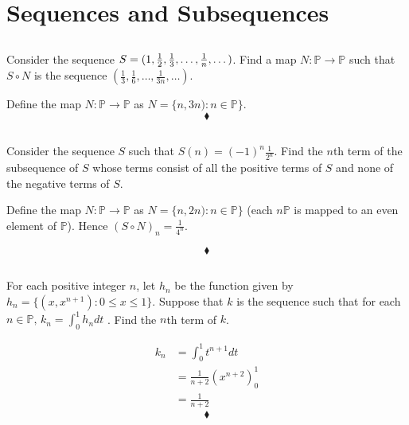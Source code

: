 \newpage

 \section{Sequences and Subsequences}
\subsection{}
\begin{tcolorbox}
Consider the sequence $S = (1,\frac{1}{2},\frac{1}{3},\dots,\frac{1}{n },\dots)$. Find a map $N:\mathbb{P}\rightarrow \mathbb{P}$ such that $S\circ N$  is the sequence $(\frac{1}{3}, \frac{1}{6},\dots , \frac{1}{3n},\dots )$. 
\end{tcolorbox}
$$ $$
Define the  map $N:\mathbb{P}\rightarrow \mathbb{P}$ as $N=\{n,3n):n\in\mathbb{P}\}$.
$$\blacklozenge$$

\subsection{}
\begin{tcolorbox}
Consider the sequence $S$ such that $S(n) = (-1)^n \frac{1}{2^n}$. Find the $n$th term of the subsequence of $S$ whose terms consist of all the positive terms of $S$ and none of the negative terms of $S$.
\end{tcolorbox}
$$ $$
Define the  map $N:\mathbb{P}\rightarrow \mathbb{P}$ as $N=\{n,2n):n\in\mathbb{P}\}$ (each $n\mathbb{P}$ is mapped to an even element of $\mathbb{P}$). Hence $(S\circ N)_n =  \frac{1}{4^n}$.

$$\blacklozenge$$

\subsection{}
\begin{tcolorbox}
For each positive integer $n$, let $h_n$ be the function given by $h_n= \{(x, x^{n+1}):0 \le x\le 1\}$. Suppose that $k$ is the sequence such that for each $n\in \mathbb{P},\, k_n=\int^1_0 h_n dt$ . Find the $n$th term of $k$. 
\end{tcolorbox}
$$ $$
\begin{align*}
k_n&=\int^1_0 t^{n+1} dt\\
&= \frac{1}{n+2}(x^{n+2})_{0}^{1}\\
&= \frac{1}{n+2}
\end{align*}
$$\blacklozenge$$

